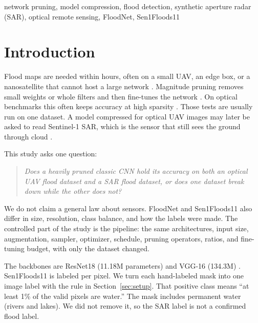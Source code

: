 \documentclass[conference]{IEEEtran}
\begin{document}
\begin{IEEEkeywords}
network pruning, model compression, flood detection, synthetic
aperture radar (SAR), optical remote sensing, FloodNet, Sen1Floods11
\end{IEEEkeywords}

\section{Introduction}
Flood maps are needed within hours, often on a small UAV, an edge box,
or a nanosatellite that cannot host a large network
\cite{rahnemoonfar2021floodnet,khan2023floodresnet50}. Magnitude
pruning removes small weights or whole filters and then fine-tunes the
network \cite{han2015learning,li2017pruning,hoefler2021sparsity}. On
optical benchmarks this often keeps accuracy at high sparsity
\cite{blalock2020state}. Those tests are usually run on one dataset.
A model compressed for optical UAV images may later be asked to read
Sentinel-1 SAR, which is the sensor that still sees the ground through
cloud \cite{bonafilia2020sen1floods11}.

This study asks one question:
\begin{quote}
\emph{Does a heavily pruned classic CNN hold its accuracy on both an
optical UAV flood dataset and a SAR flood dataset, or does one dataset
break down while the other does not?}
\end{quote}
We do not claim a general law about sensors. FloodNet and Sen1Floods11
also differ in size, resolution, class balance, and how the labels were
made. The controlled part of the study is the pipeline: the same
architectures, input size, augmentation, sampler, optimizer, schedule,
pruning operators, ratios, and fine-tuning budget, with only the
dataset changed.

The backbones are ResNet18 (11.18M parameters) \cite{he2016resnet} and
VGG-16 (134.3M) \cite{simonyan2015vgg}. Sen1Floods11 is labeled per
pixel. We turn each hand-labeled mask into one image label with the
rule in Section~\ref{sec:setup}. That positive class means ``at least
1\% of the valid pixels are water.'' The mask includes permanent water
(rivers and lakes). We did not remove it, so the SAR label is not a
confirmed flood label.
\end{document}
